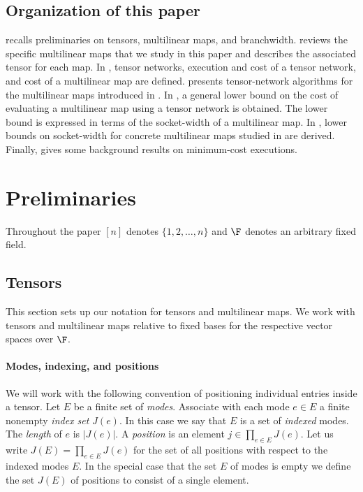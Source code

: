 \subsection{Organization of this paper}

 recalls preliminaries on tensors, multilinear maps, and branchwidth.  reviews the specific multilinear maps that we study in this %
paper  %
and describes
the associated tensor for each map. In , tensor networks, execution and cost of a tensor network, and cost of a multilinear map are defined.  presents tensor-network algorithms for the multilinear maps introduced in . In , a general lower bound on the cost of evaluating a multilinear map using
a  %
%
tensor network is obtained. The lower bound is expressed in terms of the socket-width of a multilinear map. In , lower bounds on socket-width for concrete multilinear maps studied in   are derived. Finally,  gives some background results on minimum-cost executions.

\section{Preliminaries}
\label{sect:preliminaries}

Throughout the paper $[n]$ denotes $\{1,2,\ldots,n\}$ and $\F$ denotes
an arbitrary fixed field.

\subsection{Tensors}
\label{sect:tensors-maps}

This section sets up our notation for tensors and multilinear maps.
We work with tensors and multilinear maps relative to fixed bases for
the respective vector spaces over $\F$.

\paragraph*{Modes, indexing, and positions}

We will work with the following convention of positioning individual
entries inside a tensor.  Let $E$ be a finite set of 
\emph{modes}. Associate with each mode $e\in E$ a finite nonempty
\emph{index set} $J(e)$. In this case we say that $E$ is a set of
\emph{indexed} modes.  The \emph{length} of $e$ is $|J(e)|$. 
A \emph{position} is an element $j\in \prod_{e\in E}J(e)$. 
Let us write $J(E)=\prod_{e\in E}J(e)$ for the set of all
positions with respect to the indexed modes $E$.  In the special case
that the %
set $E$ of modes  %
is empty we define the
%
set $J(E)$ of positions  %
to consist of a single element.

